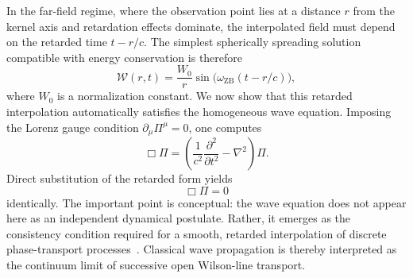 \documentclass[%
 reprint, amsmath,amssymb, aps, prb, ]{revtex4-2}
\numberwithin{equation}{section}
\newcommand{\omZB}{\omega_{\text{ZB}}}
\newcommand{\WL}{\mathcal{W}}
\begin{document}
In the far-field regime, where the observation point lies at a distance $r$ from the kernel axis and retardation effects dominate, the interpolated field must depend on the retarded time $t - r/c$. The simplest spherically spreading solution compatible with energy conservation is therefore
\begin{equation}
\WL(r,t) = \frac{W_0}{r}\sin\!\bigl(\omZB (t - r/c)\bigr),
\end{equation}
where $W_0$ is a normalization constant. We now show that this retarded interpolation automatically satisfies the homogeneous wave equation. Imposing the Lorenz gauge condition $\partial_\mu\Pi^\mu = 0$, one computes
\begin{equation}
\Box \Pi
= \left(\frac{1}{c^2}\frac{\partial^2}{\partial t^2} - \nabla^2 \right)\Pi.
\end{equation}
Direct substitution of the retarded form yields
\begin{equation}
\Box\Pi = 0
\end{equation}
identically. The important point is conceptual: the wave equation does not appear here as an independent dynamical postulate. Rather, it emerges as the consistency condition required for a smooth, retarded interpolation of discrete phase-transport processes~\cite{Jackson1998}. Classical wave propagation is thereby interpreted as the continuum limit of successive open Wilson-line transport.

\clearpage
\end{document}
